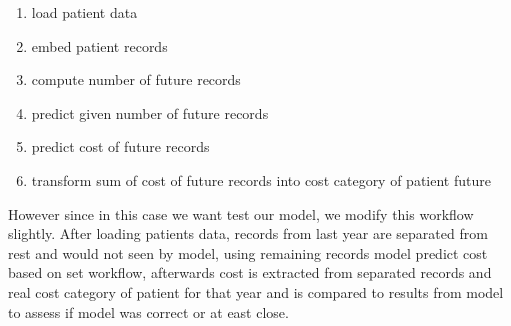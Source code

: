 \begin{enumerate}
	\item load patient data
	\item embed patient records
	\item compute number of future records
	\item predict given number of future records
	\item predict cost of future records
	\item transform sum of cost of future records into cost category of patient future
\end{enumerate}

However since in this case we want test our model, we modify this workflow slightly. After loading patients data, records from last year are separated from rest and would not seen by model, using remaining records model predict cost based on set workflow, afterwards cost is extracted from separated records and real cost category of patient for that year and is compared to results from model to assess if model was correct or at east close.